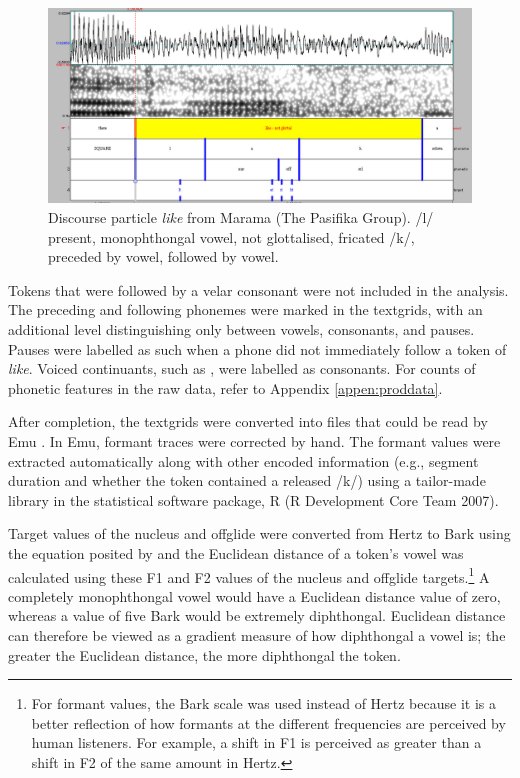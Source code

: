 \begin{figure}
	\centering
		\includegraphics[width=5in]{images/brenda15.jpg}
	\caption{Discourse particle \textit{like} from Marama (The Pasifika Group).  /l/ present, monophthongal vowel, not glottalised, fricated /k/, preceded by vowel, followed by vowel.}
	\label{fig:brenda15}
\end{figure}





Tokens that were followed by a velar consonant were not included in the analysis.  The preceding and following pho\-nemes were marked in the text\-grids, with an additional level distinguishing only between vowels, consonants, and pauses.  Pauses were labelled as such when a phone did not immediately follow a token of \textit{like}.  Voiced continuants, such as , were labelled as consonants.  For counts of phonetic features in the raw data, refer to Appendix \ref{appen:proddata}.  


After completion, the textgrids were converted into files that could be read by Emu \cite{emu}.  In Emu, formant traces were corrected by hand.  The formant values were extracted automatically along with other encoded information (e.g., segment duration and whether the token contained a released /k/) using a tailor-made library in the statistical software package, R (R Development Core Team 2007).  

Target values of the nucleus and offglide were converted from Hertz to Bark using the equation posited by  and the Euclidean distance of a token's vowel was calculated using these F1 and F2 values of the nucleus and offglide targets.\footnote{For formant values, the Bark scale was used instead of Hertz because it is a better reflection of how formants at the different frequencies are perceived by human listeners.  For example, a shift in F1 is perceived as greater than a shift in F2 of the same amount in Hertz.}  A completely monophthongal vowel would have a Euclidean distance value of zero, whereas a value of five Bark would be extremely diphthongal. Euclidean distance can therefore be viewed as a gradient measure of how diphthongal a vowel is; the greater the Euclidean distance, the more diphthongal the token. 
\nocite{r}



